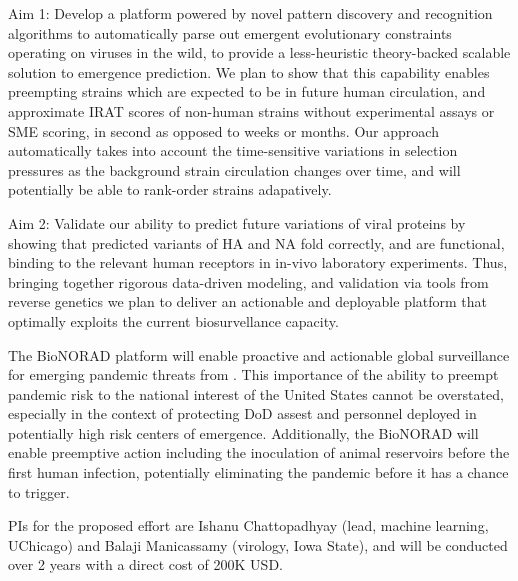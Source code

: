 \documentclass[onecolumn, compsoc,10pt]{IEEEtran}
\begin{document}
Aim 1: Develop a platform powered by novel pattern discovery and recognition algorithms to automatically parse out emergent evolutionary constraints operating on \infl viruses in the wild, to provide a less-heuristic theory-backed scalable solution to emergence prediction. %
We plan to show   that this capability enables preempting  strains which are expected to be in future human circulation, and  approximate IRAT scores of non-human strains without  experimental assays or SME scoring, in second as opposed to weeks or months. Our approach automatically takes into account the time-sensitive variations in selection pressures as the background strain circulation changes over time, and will potentially be able to rank-order strains adapatively.

Aim 2: Validate our ability to predict future variations of viral proteins by showing that predicted variants of HA and NA fold correctly, and are functional, binding to the relevant human receptors in in-vivo laboratory experiments. Thus, bringing together rigorous data-driven modeling, and validation via tools from reverse genetics we plan to deliver an actionable and deployable platform that optimally exploits the current biosurvellance capacity.

The BioNORAD platform will enable proactive and actionable global surveillance for emerging pandemic threats from \infl. This importance of the ability to preempt pandemic risk to the national interest of the United States cannot be overstated, especially in the context of protecting  DoD assest and personnel deployed in potentially high risk centers of emergence. Additionally, the BioNORAD will enable preemptive action including the inoculation of  animal reservoirs before the first human infection, potentially eliminating the pandemic before it has a chance to  trigger.

PIs for the proposed effort are Ishanu Chattopadhyay (lead, machine learning, UChicago) and Balaji Manicassamy (virology, Iowa State), and will be conducted over 2 years with a direct cost of 200K USD. 

\small


\end{document}
